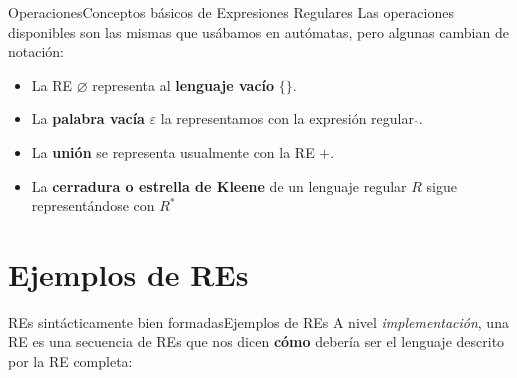 \documentclass[spanish]{beamer}
\begin{document}
\begin{frame}{Operaciones}{Conceptos básicos de Expresiones Regulares}
    Las operaciones disponibles son las mismas que usábamos en autómatas, pero algunas cambian de notación: \pause

    \bigskip

    \begin{itemize}
        \item La RE $\varnothing$ representa al \textbf{lenguaje vacío} $\{\}$. \pause
        \item La \textbf{palabra vacía} $\varepsilon$ la representamos con la expresión regular $\hat{}$. \pause
        \item La \textbf{unión} se representa usualmente con la RE $+$. \pause
        \item La \textbf{cerradura o estrella de Kleene} de un lenguaje regular $R$ sigue representándose con $R^*$
    \end{itemize}
\end{frame}

\section{Ejemplos de REs}
\label{sec:ex}

\begin{frame}{REs sintácticamente bien formadas}{Ejemplos de REs}
    A nivel \textit{implementación}, una RE es una secuencia de REs que nos dicen \textbf{cómo} debería ser el lenguaje descrito por la RE completa: \pause

    \bigskip

    \onslide

    \pause


    \pause

    
    \pause

\end{frame}
\end{document}
